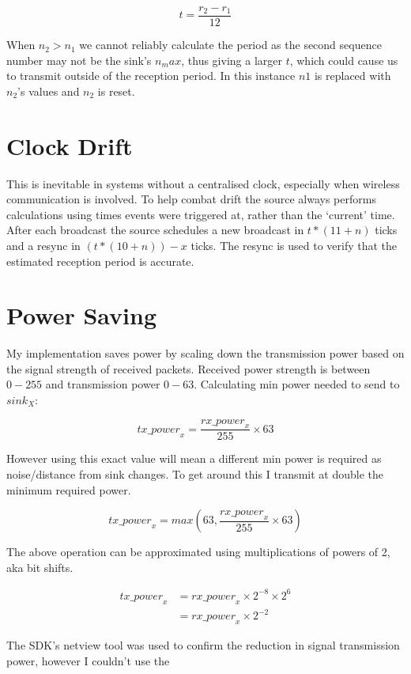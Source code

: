 \documentclass{article}
\begin{document}
$$t = \frac{r_2 -r_1} {12}$$

When $n_2 > n_1$ we cannot reliably calculate the period as the second
sequence number may not be the sink's $n_max$, thus giving a larger $t$, which could cause us to transmit outside
of the reception period. In this instance $n1$ is replaced with $n_2$'s values and $n_2$ is reset.

\section{Clock Drift}

This is inevitable in systems without a centralised clock, especially when wireless communication is involved.
To help combat drift the source always performs calculations using times events were triggered at, rather than the
`current' time. After each broadcast the source schedules a new broadcast in $t * (11 + n)$ ticks and a resync in 
$(t * (10 + n)) - x$ ticks. The resync is used to verify that the estimated reception period is accurate.

\section{Power Saving}

My implementation saves power by scaling down the transmission power based on the signal strength of received packets.
Received power strength is between $0-255$ and transmission power $0-63$. Calculating min power needed to send to $sink_X$:

$$
\mathit{tx\_power}_x = \frac{\mathit{rx\_power}_x} {255} \times 63
$$

However using this exact value will mean a different min power is required as noise/distance from sink changes. To get around
this I transmit at double the minimum required power.

$$
\mathit{tx\_power}_x = max(63, \frac{\mathit{rx\_power}_x} {255} \times 63)
$$

The above operation can be approximated using multiplications of powers of 2, aka bit shifts.

\begin{align*}
\mathit{tx\_power}_x
&= \mathit{rx\_power}_x \times 2^{-8} \times 2^6 \\
&= \mathit{rx\_power}_x \times 2^{-2}
\end{align*}

The SDK's netview tool was used to confirm the reduction in signal transmission power, however I couldn't use the 
\end{document}

